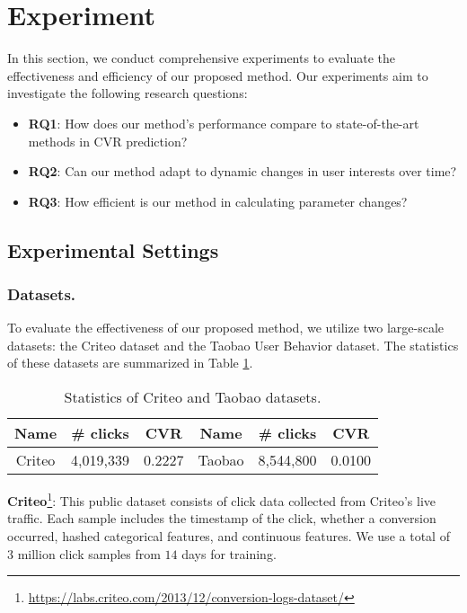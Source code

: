 \section{Experiment}
In this section, we conduct comprehensive experiments to evaluate the effectiveness and efficiency of our proposed method. Our experiments aim to investigate the following research questions:
\begin{itemize}[left=0pt]
    \item \textbf{RQ1}: How does our method's performance compare to state-of-the-art methods in CVR prediction?
    \item \textbf{RQ2}: Can our method adapt to dynamic changes in user interests over time?
    \item \textbf{RQ3}: How efficient is our method in calculating parameter changes?
\end{itemize}

\subsection{Experimental Settings}
\subsubsection{Datasets.}
To evaluate the effectiveness of our proposed method, we utilize two large-scale datasets: the Criteo dataset and the Taobao User Behavior dataset. The statistics of these datasets are summarized in Table \ref{dataset}.
\begin{table}[htbp]
\begin{center}
\setlength{\tabcolsep}{5pt}
\vspace{-5pt}
\caption{Statistics of Criteo and Taobao datasets.}
\vspace{-10pt}
\small
\label{dataset}
\begin{tabular}{ccc|ccc}
\toprule
{Name}    & {\# clicks} & {CVR} & {Name}   & {\# clicks} & {CVR} \\ \midrule
{Criteo}   &    4,019,339       &  0.2227   & {Taobao}     &   8,544,800        &   0.0100  \\ \bottomrule
\end{tabular}
\end{center}
\vspace{-10pt}
\end{table}

\textbf{Criteo}\footnote{\url{https://labs.criteo.com/2013/12/conversion-logs-dataset/}}: This public dataset consists of click data collected from Criteo's live traffic. Each sample includes the timestamp of the click, whether a conversion occurred, hashed categorical features, and continuous features. We use a total of $3$ million click samples from $14$ days for training.

